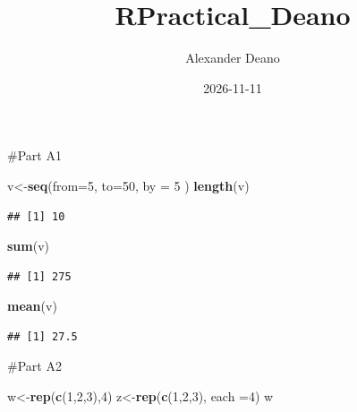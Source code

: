 \documentclass[
]{article}
\title{RPractical\_Deano}
\author{Alexander Deano}
\date{2026-11-11}
\newenvironment{Shaded}{\begin{snugshade}}{\end{snugshade}}
\newcommand{\AttributeTok}[1]{\textcolor[rgb]{0.13,0.29,0.53}{#1}}
\newcommand{\DecValTok}[1]{\textcolor[rgb]{0.00,0.00,0.81}{#1}}
\newcommand{\FunctionTok}[1]{\textcolor[rgb]{0.13,0.29,0.53}{\textbf{#1}}}
\newcommand{\NormalTok}[1]{#1}
\newcommand{\OtherTok}[1]{\textcolor[rgb]{0.56,0.35,0.01}{#1}}
\begin{document}
\maketitle

\#Part A1

\begin{Shaded}
\begin{Highlighting}[]
\NormalTok{v}\OtherTok{\textless{}{-}}\FunctionTok{seq}\NormalTok{(}\AttributeTok{from=}\DecValTok{5}\NormalTok{, }\AttributeTok{to=}\DecValTok{50}\NormalTok{, }\AttributeTok{by =} \DecValTok{5}\NormalTok{ )}
\FunctionTok{length}\NormalTok{(v)}
\end{Highlighting}
\end{Shaded}

\begin{verbatim}
## [1] 10
\end{verbatim}

\begin{Shaded}
\begin{Highlighting}[]
\FunctionTok{sum}\NormalTok{(v)}
\end{Highlighting}
\end{Shaded}

\begin{verbatim}
## [1] 275
\end{verbatim}

\begin{Shaded}
\begin{Highlighting}[]
\FunctionTok{mean}\NormalTok{(v)}
\end{Highlighting}
\end{Shaded}

\begin{verbatim}
## [1] 27.5
\end{verbatim}

\#Part A2

\begin{Shaded}
\begin{Highlighting}[]
\NormalTok{w}\OtherTok{\textless{}{-}}\FunctionTok{rep}\NormalTok{(}\FunctionTok{c}\NormalTok{(}\DecValTok{1}\NormalTok{,}\DecValTok{2}\NormalTok{,}\DecValTok{3}\NormalTok{),}\DecValTok{4}\NormalTok{)}
\NormalTok{z}\OtherTok{\textless{}{-}}\FunctionTok{rep}\NormalTok{(}\FunctionTok{c}\NormalTok{(}\DecValTok{1}\NormalTok{,}\DecValTok{2}\NormalTok{,}\DecValTok{3}\NormalTok{), }\AttributeTok{each =}\DecValTok{4}\NormalTok{)}
\NormalTok{w}
\end{Highlighting}
\end{Shaded}
\end{document}
